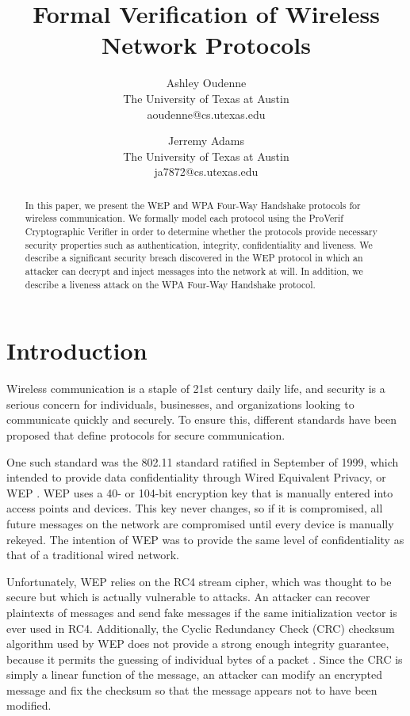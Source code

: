 \documentclass[11pt, twocolumn]{article} %
\title{\textbf{Formal Verification of Wireless Network Protocols}}
\author{
	Ashley Oudenne\\
	The University of Texas at Austin\\
	aoudenne@cs.utexas.edu\\
	\and
	Jerremy Adams\\
	The University of Texas at Austin\\
	ja7872@cs.utexas.edu
}
\begin{document}
\maketitle
\begin{abstract}
In this paper, we present the WEP and WPA Four-Way Handshake protocols for wireless communication.  We formally model each protocol using the ProVerif Cryptographic Verifier in order to determine whether the protocols provide necessary security properties such as authentication, integrity, confidentiality and liveness.  We describe a significant security breach discovered in the WEP protocol in which an attacker can decrypt and inject messages into the network at will.  In addition, we describe a liveness attack on the WPA Four-Way Handshake protocol.  
 
\end{abstract}

\section{Introduction}
Wireless communication is a staple of 21st century daily life, and security is a serious concern for individuals, businesses, and organizations looking to communicate quickly and securely.  To ensure this, different standards have been proposed that define protocols for secure communication.  

One such standard was the 802.11 standard ratified in September of 1999, which intended to provide data confidentiality through Wired Equivalent Privacy, or WEP \cite{IEEE802.11}.  WEP uses a 40- or 104-bit encryption key that is manually entered into access points and devices.  This key never changes, so if it is compromised, all future messages on the network are compromised until every device is manually rekeyed.  The intention of WEP was to provide the same level of confidentiality as that of a traditional wired network.  

Unfortunately, WEP relies on the RC4 stream cipher, which was thought to be secure but which is actually vulnerable to attacks.  An attacker can recover plaintexts of messages and send fake messages if the same initialization vector is ever used in RC4.  Additionally, the Cyclic Redundancy Check (CRC) checksum algorithm used by WEP does not provide a strong enough integrity guarantee, because it permits the guessing of individual bytes of a packet \cite{bulbul08}.  Since the CRC is simply a linear function of the message, an attacker can modify an encrypted message and fix the checksum so that the message appears not to have been modified.
\end{document}
